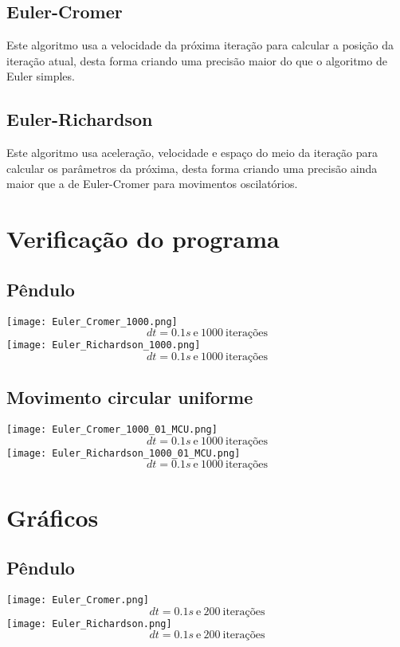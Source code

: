 \documentclass[a4paper, 12pt]{article}
\begin{document}
\subsection*{Euler-Cromer}
Este algoritmo usa a velocidade da próxima iteração para calcular a 
posição da iteração atual, desta forma criando uma precisão maior do 
que o algoritmo de Euler simples.

\subsection*{Euler-Richardson}
Este algoritmo usa aceleração, velocidade e espaço do meio da iteração
para calcular os parâmetros da próxima, desta forma criando uma precisão
ainda maior que a de Euler-Cromer para movimentos oscilatórios.

\section*{Verificação do programa}
\subsection*{Pêndulo}
\texttt{[image: Euler\_Cromer\_1000.png]} \\
$$dt=0.1s\ \text{e}\ 1000\ \text{iterações}$$
\texttt{[image: Euler\_Richardson\_1000.png]} \\
$$dt=0.1s\ \text{e}\ 1000\ \text{iterações}$$


\subsection*{Movimento circular uniforme}
\texttt{[image: Euler\_Cromer\_1000\_01\_MCU.png]} \\
$$dt=0.1s\ \text{e}\ 1000\ \text{iterações}$$
\texttt{[image: Euler\_Richardson\_1000\_01\_MCU.png]} \\
$$dt=0.1s\ \text{e}\ 1000\ \text{iterações}$$

\section*{Gráficos}
\subsection*{Pêndulo}
\texttt{[image: Euler\_Cromer.png]} \\
$$dt=0.1s\ \text{e}\ 200\ \text{iterações}$$
\texttt{[image: Euler\_Richardson.png]} \\
$$dt=0.1s\ \text{e}\ 200\ \text{iterações}$$
\end{document}
